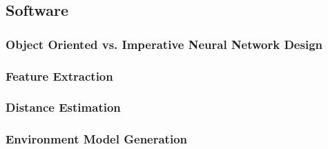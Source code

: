 \subsection{Software}
\subsubsection{Object Oriented vs. Imperative Neural Network Design}
\subsubsection{Feature Extraction}
\subsubsection{}
\subsubsection{Distance Estimation}
\subsubsection{Environment Model Generation}